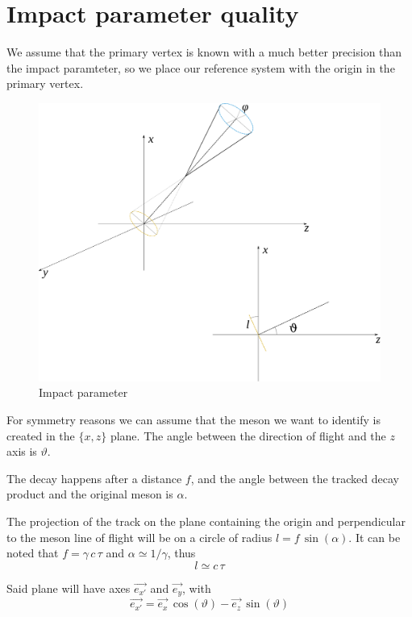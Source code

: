 \documentclass[10pt,a4paper]{article}
\begin{document}
\section{Impact parameter quality}
We assume that the primary vertex is known with a much better
precision than the impact paramteter, so we place our reference system
with the origin in the primary vertex.

\begin{figure}[h]
\begin{center}
\includegraphics[height=0.5\textwidth]{impact_parameter.pdf}
\caption{Impact parameter}
\label{fig:impact}
\end{center}
\end{figure}

For symmetry reasons we can assume that the meson we want to identify
is created in the $\{x,z\}$ plane. The angle between the direction of
flight and the $z$ axis is $\vartheta$.

The decay happens after a distance $f$, and the angle between the
tracked decay product and the original meson is $\alpha$.

The projection of the track on the plane containing the origin and
perpendicular to the meson line of flight will be on a circle of
radius $l=f\,\sin(\alpha)$. It can be noted that $f=\gamma\,c\,\tau$
and $\alpha \simeq 1/\gamma$, thus
\begin{equation}
l \simeq c \, \tau
\end{equation}

Said plane will have axes $\vec{e_{x'}}$ and $\vec{e_y}$, with
\begin{equation}
  \vec{e_{x'}} = \vec{e_x}\,\cos(\vartheta) - \vec{e_z}\,\sin(\vartheta)
\end{equation}
\end{document}
